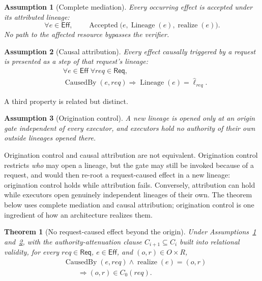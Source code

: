 \documentclass[10pt,twocolumn]{article}
\newtheorem{theorem}{Theorem}
\newtheorem{assumption}{Assumption}
\begin{document}
\begin{assumption}[Complete mediation]\label{ass:mediation}
Every occurring effect is accepted under its attributed lineage:
\[
\forall e\in\mathsf{Eff},\qquad
\operatorname{Accepted}\bigl(
e,\operatorname{Lineage}(e),\operatorname{realize}(e)
\bigr).
\]
No path to the affected resource bypasses the verifier.
\end{assumption}

\begin{assumption}[Causal attribution]\label{ass:attribution}
Every effect causally triggered by a request is presented as a step of that
request's lineage:
\[
\begin{aligned}
&\forall e\in\mathsf{Eff}\;\forall req\in\mathsf{Req},\\
&\operatorname{CausedBy}(e,req)
\Longrightarrow
\operatorname{Lineage}(e)=\widehat{\ell}_{req}.
\end{aligned}
\]
\end{assumption}

A third property is related but distinct.

\begin{assumption}[Origination control]\label{ass:origination}
A new lineage is opened only at an origin gate independent of every executor,
and executors hold no authority of their own outside lineages opened there.
\end{assumption}

Origination control and causal attribution are not equivalent. Origination
control restricts \emph{who} may open a lineage, but the gate may still be
invoked because of a request, and would then re-root a request-caused effect in
a new lineage: origination control holds while attribution fails. Conversely,
attribution can hold while executors open genuinely independent lineages of
their own. The theorem below uses complete mediation and causal attribution;
origination control is one ingredient of how an architecture realizes them.

\begin{theorem}[No request-caused effect beyond the origin]\label{thm:causal-bound}
Under Assumptions~\ref{ass:mediation} and~\ref{ass:attribution}, with the
authority-attenuation clause \(C_{i+1}\subseteq C_i\) built into relational
validity, for every
\(req\in\mathsf{Req}\), \(e\in\mathsf{Eff}\), and \((o,r)\in O\times R\),
\[
\begin{aligned}
&\operatorname{CausedBy}(e,req)
\land
\operatorname{realize}(e)=(o,r)\\
&\hspace{2em}\Longrightarrow
(o,r)\in C_0(req).
\end{aligned}
\]
\end{theorem}
\end{document}
